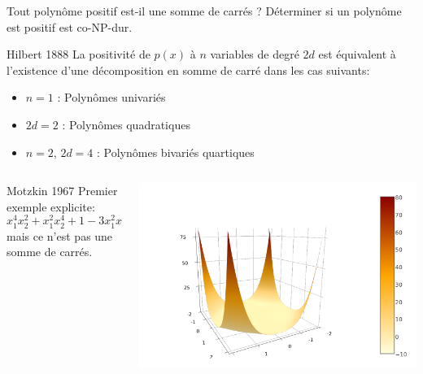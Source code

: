\documentclass{beamer}
\begin{document}
  \begin{frame}{Tout polynôme positif est-il une somme de carrés ?}
    Déterminer si un polynôme est positif est co-\alert{NP-dur}.
    \begin{block}{Hilbert 1888}
      La positivité de $p(x)$ à $n$ variables de degré $2d$ est équivalent à l'\alert{existence} d'une décomposition
      en somme de carré dans les cas suivants:
      \begin{itemize}
        \item $n = 1$ : Polynômes univariés
        \item $2d = 2$ : Polynômes quadratiques
        \item $n = 2$, $2d = 4$ : Polynômes bivariés quartiques
      \end{itemize}
    \end{block}
    \begin{columns}
      \begin{column}{0.7\textwidth}
    \begin{block}{Motzkin 1967}
      Premier exemple \alert{explicite}:
      \[ x_1^4x_2^2 + x_1^2x_2^4 + 1 - 3x_1^2x_2^2 \geq 0 \quad \forall x \]
      mais ce n'est pas une somme de carrés.
    \end{block}
      \end{column}
      \begin{column}{0.3\textwidth}
        \centering
        \includegraphics[trim=3cm .7cm 6cm 3cm, clip, width=\textwidth]{motzkin.png}
      \end{column}
    \end{columns}
  \end{frame}
\end{document}
